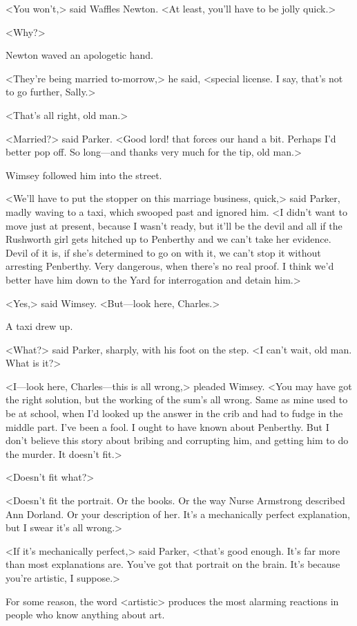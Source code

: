 <You won't,> said Waffles Newton. <At least, you'll have to be jolly quick.>

<Why?>

Newton waved an apologetic hand.

<They're being married to-morrow,> he said, <special license. I say, that's not to go further, Sally.>

<That's all right, old man.>

<Married?> said Parker. <Good lord! that forces our hand a bit. Perhaps I'd better pop off. So long—and thanks very much for the tip, old man.>

Wimsey followed him into the street.

<We'll have to put the stopper on this marriage business, quick,> said Parker, madly waving to a taxi, which swooped past and ignored him. <I didn't want to move just at present, because I wasn't ready, but it'll be the devil and all if the Rushworth girl gets hitched up to Penberthy and we can't take her evidence. Devil of it is, if she's determined to go on with it, we can't stop it without arresting Penberthy. Very dangerous, when there's no real proof. I think we'd better have him down to the Yard for interrogation and detain him.>

<Yes,> said Wimsey. <But—look here, Charles.>

A taxi drew up.

<What?> said Parker, sharply, with his foot on the step. <I can't wait, old man. What is it?>

<I—look here, Charles—this is all wrong,> pleaded Wimsey. <You may have got the right solution, but the working of the sum's all wrong. Same as mine used to be at school, when I'd looked up the answer in the crib and had to fudge in the middle part. I've been a fool. I ought to have known about Penberthy. But I don't believe this story about bribing and corrupting him, and getting him to do the murder. It doesn't fit.>

<Doesn't fit what?>

<Doesn't fit the portrait. Or the books. Or the way Nurse Armstrong described Ann Dorland. Or your description of her. It's a mechanically perfect explanation, but I swear it's all wrong.>

<If it's mechanically perfect,> said Parker, <that's good enough. It's far more than most explanations are. You've got that portrait on the brain. It's because you're artistic, I suppose.>

For some reason, the word <artistic> produces the most alarming reactions in people who know anything about art.

